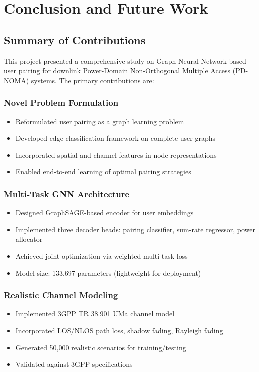 \chapter{Conclusion and Future Work}
\label{chap:conclusion}

\section{Summary of Contributions}

This project presented a comprehensive study on Graph Neural Network-based user pairing for downlink Power-Domain Non-Orthogonal Multiple Access (PD-NOMA) systems. The primary contributions are:

\subsection{Novel Problem Formulation}
\begin{itemize}
    \item Reformulated user pairing as a graph learning problem
    \item Developed edge classification framework on complete user graphs
    \item Incorporated spatial and channel features in node representations
    \item Enabled end-to-end learning of optimal pairing strategies
\end{itemize}

\subsection{Multi-Task GNN Architecture}
\begin{itemize}
    \item Designed GraphSAGE-based encoder for user embeddings
    \item Implemented three decoder heads: pairing classifier, sum-rate regressor, power allocator
    \item Achieved joint optimization via weighted multi-task loss
    \item Model size: 133,697 parameters (lightweight for deployment)
\end{itemize}

\subsection{Realistic Channel Modeling}
\begin{itemize}
    \item Implemented 3GPP TR 38.901 UMa channel model
    \item Incorporated LOS/NLOS path loss, shadow fading, Rayleigh fading
    \item Generated 50,000 realistic scenarios for training/testing
    \item Validated against 3GPP specifications
\end{itemize}

